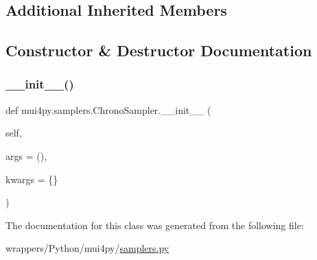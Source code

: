 \subsection*{Additional Inherited Members}


\subsection{Constructor \& Destructor Documentation}
\mbox{\label{classmui4py_1_1samplers_1_1_chrono_sampler_a2991d523966ed5846bf0210a7e3d5f0e}} 
\subsubsection{\texorpdfstring{\+\_\+\+\_\+init\+\_\+\+\_\+()}{\_\_init\_\_()}}
{\footnotesize\ttfamily def mui4py.\+samplers.\+Chrono\+Sampler.\+\_\+\+\_\+init\+\_\+\+\_\+ (\begin{DoxyParamCaption}\item[{}]{self,  }\item[{}]{args = {\ttfamily ()},  }\item[{}]{kwargs = {\ttfamily \{\}} }\end{DoxyParamCaption})}



The documentation for this class was generated from the following file\+:\begin{DoxyCompactItemize}
\item 
wrappers/\+Python/mui4py/\hyperlink{samplers_8py}{samplers.\+py}\end{DoxyCompactItemize}
